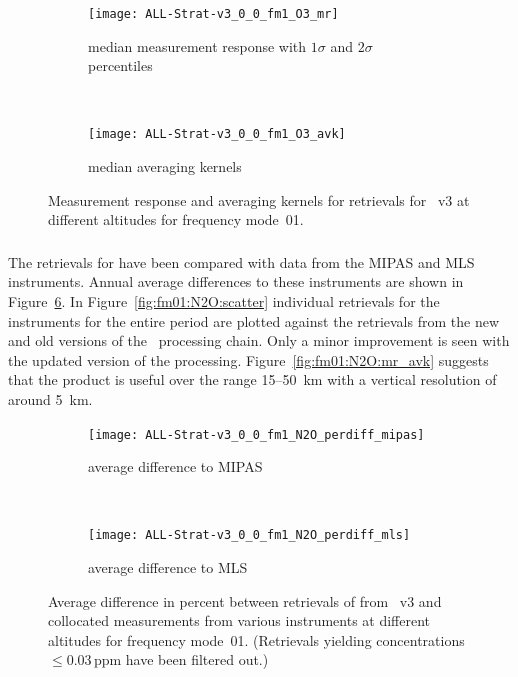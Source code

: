 \begin{figure}[tbhp]
    \centering
    \begin{subfigure}[b]{0.49\textwidth}
        \texttt{[image: ALL-Strat-v3\_0\_0\_fm1\_O3\_mr]}
        \caption{median measurement response with $1\sigma$ and $2\sigma$
        percentiles}
        \label{fig:fm01:O3:mr}
    \end{subfigure}
    \,
    \begin{subfigure}[b]{0.49\textwidth}
        \texttt{[image: ALL-Strat-v3\_0\_0\_fm1\_O3\_avk]}
        \caption{median averaging kernels\newline~}
        \label{fig:fm01:O3:avk}
    \end{subfigure}
    \caption{Measurement response and averaging kernels for 
    retrievals for \smr~v3 at different altitudes for frequency mode~01.}
    \label{fig:fm01:O3:mr_avk}
\end{figure}



\subsubsection{}
\label{sec:fm01:comparison:N2O}
The retrievals for  have been compared with data from the MIPAS and
MLS instruments. Annual average differences to these instruments are shown in
Figure~\ref{fig:fm01:N2O:profiles}. In Figure~\ref{fig:fm01:N2O:scatter}
individual retrievals for the instruments for the entire period are plotted
against the retrievals from the new and old versions of the \smr\ processing
chain. Only a minor improvement is seen with the updated version of the
processing. Figure~\ref{fig:fm01:N2O:mr_avk} suggests that the product is
useful over the range 15--50~km with a vertical resolution of around 5~km.


\begin{figure}[tbhp]
    \centering
    \begin{subfigure}[b]{0.49\textwidth}
        \texttt{[image: ALL-Strat-v3\_0\_0\_fm1\_N2O\_perdiff\_mipas]}
        \caption{average difference to MIPAS}
        \label{fig:fm01:N2O:profiles:MIPAS}
    \end{subfigure}
    \,
    \begin{subfigure}[b]{0.49\textwidth}
        \texttt{[image: ALL-Strat-v3\_0\_0\_fm1\_N2O\_perdiff\_mls]}
        \caption{average difference to MLS}
        \label{fig:fm01:N2O:profiles:MLS}
    \end{subfigure}
    \caption{Average difference in percent between retrievals of 
    from \smr~v3 and collocated measurements from various instruments at
    different altitudes for frequency mode~01. (Retrievals yielding
    concentrations $\leq 0.03\,\mathrm{ppm}$ have been filtered out.)}
    \label{fig:fm01:N2O:profiles}
\end{figure}

